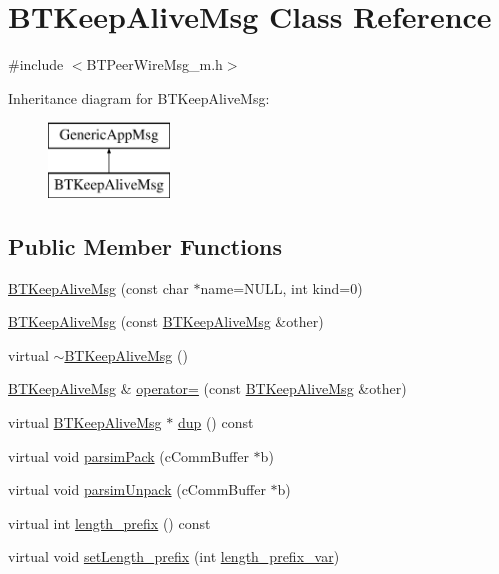 \hypertarget{classBTKeepAliveMsg}{}\section{B\+T\+Keep\+Alive\+Msg Class Reference}
\label{classBTKeepAliveMsg}


{\ttfamily \#include $<$B\+T\+Peer\+Wire\+Msg\+\_\+m.\+h$>$}

Inheritance diagram for B\+T\+Keep\+Alive\+Msg\+:\begin{figure}[H]
\begin{center}
\leavevmode
\includegraphics[height=2.000000cm]{classBTKeepAliveMsg}
\end{center}
\end{figure}
\subsection*{Public Member Functions}
\begin{DoxyCompactItemize}
\item 
\hyperlink{classBTKeepAliveMsg_a7d9a58900831a1ba095dfbde7d7be33a}{B\+T\+Keep\+Alive\+Msg} (const char $\ast$name=N\+U\+L\+L, int kind=0)
\item 
\hyperlink{classBTKeepAliveMsg_a9ce38e0df3601cd71f4d2f51ff2bd09d}{B\+T\+Keep\+Alive\+Msg} (const \hyperlink{classBTKeepAliveMsg}{B\+T\+Keep\+Alive\+Msg} \&other)
\item 
virtual \hyperlink{classBTKeepAliveMsg_a6c23e4aac5102beca1de9988a145c0e8}{$\sim$\+B\+T\+Keep\+Alive\+Msg} ()
\item 
\hyperlink{classBTKeepAliveMsg}{B\+T\+Keep\+Alive\+Msg} \& \hyperlink{classBTKeepAliveMsg_a7c915b5dcf9eb4f6dbc13b54aaba54c3}{operator=} (const \hyperlink{classBTKeepAliveMsg}{B\+T\+Keep\+Alive\+Msg} \&other)
\item 
virtual \hyperlink{classBTKeepAliveMsg}{B\+T\+Keep\+Alive\+Msg} $\ast$ \hyperlink{classBTKeepAliveMsg_a78c1a768c8a1724a3920c38825fd76f2}{dup} () const 
\item 
virtual void \hyperlink{classBTKeepAliveMsg_ad7fca4e57bb7bc2e0f52714b1ab59497}{parsim\+Pack} (c\+Comm\+Buffer $\ast$b)
\item 
virtual void \hyperlink{classBTKeepAliveMsg_abc3e9c12e7bd5031abf370577b23ee84}{parsim\+Unpack} (c\+Comm\+Buffer $\ast$b)
\item 
virtual int \hyperlink{classBTKeepAliveMsg_a2f9bca506f768fd7a15e6e0d8692c540}{length\+\_\+prefix} () const 
\item 
virtual void \hyperlink{classBTKeepAliveMsg_a491c41f40ffc11c132e48393fe2c5c52}{set\+Length\+\_\+prefix} (int \hyperlink{classBTKeepAliveMsg_a966d742d7272d0ae62f7954fa2607644}{length\+\_\+prefix\+\_\+var})
\end{DoxyCompactItemize}
